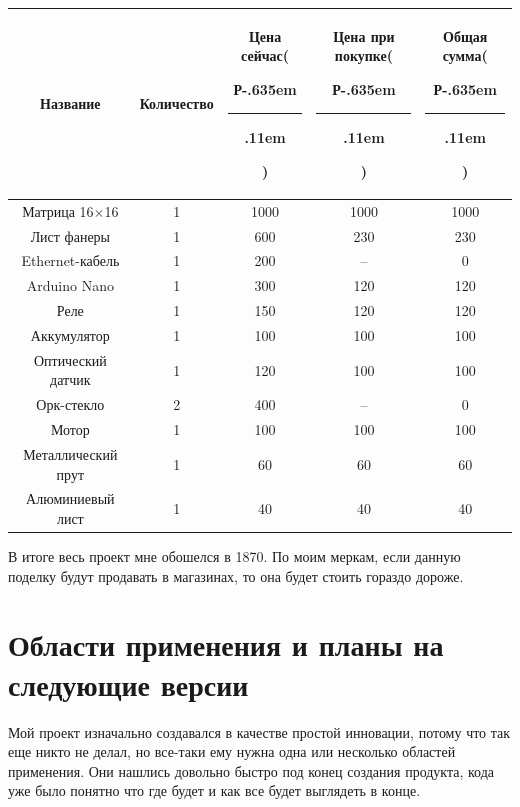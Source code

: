 \documentclass[a4paper, 12pt]{article}
\newcommand{\rub}{{\rm{Р}\kern-.635em\rule[.5ex]{.52em}{.04em}\kern.11em}}
\begin{document}
\begin{center}
  \begin{tabular}{|c|c|c|c|c|}
    \hline
    Название             & Количество & Цена сейчас(\rub) & Цена при покупке(\rub) & Общая сумма(\rub) \\
    \hline
    Матрица 16$\times$16 & 1          & 1000              & 1000                   & 1000              \\
    \hline
    Лист фанеры          & 1          & 600               & 230                    & 230               \\
    \hline
    Ethernet-кабель      & 1          & 200               & --                     & 0                 \\
    \hline
    Arduino Nano         & 1          & 300               & 120                    & 120               \\
    \hline
    Реле                 & 1          & 150               & 120                    & 120               \\
    \hline
    Аккумулятор          & 1          & 100               & 100                    & 100               \\
    \hline
    Оптический датчик    & 1          & 120               & 100                    & 100               \\
    \hline
    Орк-стекло           & 2          & 400               & --                     & 0                 \\
    \hline
    Мотор                & 1          & 100               & 100                    & 100               \\
    \hline
    Металлический прут   & 1          & 60                & 60                     & 60                \\
    \hline
    Алюминиевый лист     & 1          & 40                & 40                     & 40                \\
    \hline
  \end{tabular}
\end{center}
В итоге весь проект мне обошелся в 1870. По моим меркам, если данную поделку будут продавать в магазинах, то она будет стоить гораздо дороже.
\newpage
\section{Области применения и планы на следующие версии}

Мой проект изначально создавался в качестве простой инновации, потому
что так еще никто не делал, но все-таки ему нужна одна или несколько
областей применения. Они нашлись довольно быстро под конец создания
продукта, кода уже было понятно что где будет и как все будет
выглядеть в конце.
\end{document}
